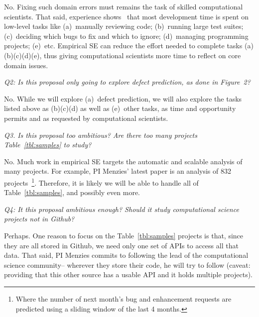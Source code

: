 \documentclass{NSF}
\newcommand{\tbl}[1]{Table~\ref{tbl:#1}}
\begin{document}
\begin{nsfdescription}
No. Fixing such domain errors  must remains the
task of skilled computational scientists. 
That said, experience   shows~\cite{Holzmann:2017} that most   development time
is spent on  low-level  tasks like
(a)~manually reviewing code;
(b)~running large test suites;
(c)~deciding which bugs to fix and which to ignore;
(d)~managing programming projects; 
(e)~etc.
Empirical SE can reduce the effort
needed to complete   tasks (a)(b)(c)(d)(e), thus giving computational scientists
more time to reflect on core domain issues.

{\em Q2: Is this proposal
only going to explore defect prediction, 
as done in Figure~2?}

 No. While we will explore (a)~defect prediction,
we will
also explore the tasks  listed above as (b)(c)(d)  as well as (e)~other tasks, as time and opportunity permits and as requested by   computational
scientists. 

{\em Q3. Is this proposal   too ambitious?
Are there too many projects
\tbl{samples} to study?}

No. Much work in empirical SE targets the 
automatic and scalable analysis of many projects.
For example,
PI Menzies' latest paper is an analysis of
832 projects~\cite{krishna2018connection}\footnote{ Where the number of  next month's bug and enhancement
requests are predicted
using a sliding window of the last 4 months.}.
Therefore, it is likely we will be able to handle 
all of \tbl{samples}, and possibly even more.

{\em Q4: It this proposal ambitious enough? Should it study 
computational
science  projects
{\em not} in Github? }

Perhaps. One reason to focus
on the   \tbl{samples} projects is that, since they are all stored in Github, we need only one set of APIs to access all that data. 
That said, 
PI Menzies commits to following the lead of the 
computational science community-- wherever they
store their code, he will try to follow (caveat: providing that this other
source has a usable API and it holds multiple projects).


\end{nsfdescription}
\end{document}
